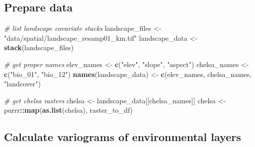 \documentclass[]{article}
\newenvironment{Shaded}{\begin{snugshade}}{\end{snugshade}}
\newcommand{\CommentTok}[1]{\textcolor[rgb]{0.56,0.35,0.01}{\textit{#1}}}
\newcommand{\KeywordTok}[1]{\textcolor[rgb]{0.13,0.29,0.53}{\textbf{#1}}}
\newcommand{\NormalTok}[1]{#1}
\newcommand{\OperatorTok}[1]{\textcolor[rgb]{0.81,0.36,0.00}{\textbf{#1}}}
\newcommand{\StringTok}[1]{\textcolor[rgb]{0.31,0.60,0.02}{#1}}
\begin{document}
\hypertarget{prepare-data}{%
\subsection{Prepare data}\label{prepare-data}}

\begin{Shaded}
\begin{Highlighting}[numbers=left,,]
\CommentTok{# list landscape covariate stacks}
\NormalTok{landscape_files <-}\StringTok{ "data/spatial/landscape_resamp01_km.tif"}
\NormalTok{landscape_data <-}\StringTok{ }\KeywordTok{stack}\NormalTok{(landscape_files)}

\CommentTok{# get proper names}
\NormalTok{elev_names <-}\StringTok{ }\KeywordTok{c}\NormalTok{(}\StringTok{"elev"}\NormalTok{, }\StringTok{"slope"}\NormalTok{, }\StringTok{"aspect"}\NormalTok{)}
\NormalTok{chelsa_names <-}\StringTok{ }\KeywordTok{c}\NormalTok{(}\StringTok{"bio_01"}\NormalTok{, }\StringTok{"bio_12"}\NormalTok{)}
\KeywordTok{names}\NormalTok{(landscape_data) <-}\StringTok{ }\KeywordTok{c}\NormalTok{(elev_names, chelsa_names, }\StringTok{"landcover"}\NormalTok{)}


\CommentTok{# get chelsa rasters}
\NormalTok{chelsa <-}\StringTok{ }\NormalTok{landscape_data[[chelsa_names]]}
\NormalTok{chelsa <-}\StringTok{ }\NormalTok{purrr}\OperatorTok{::}\KeywordTok{map}\NormalTok{(}\KeywordTok{as.list}\NormalTok{(chelsa), raster_to_df)}
\end{Highlighting}
\end{Shaded}

\hypertarget{calculate-variograms-of-environmental-layers}{%
\subsection{Calculate variograms of environmental layers}\label{calculate-variograms-of-environmental-layers}}
\end{document}
